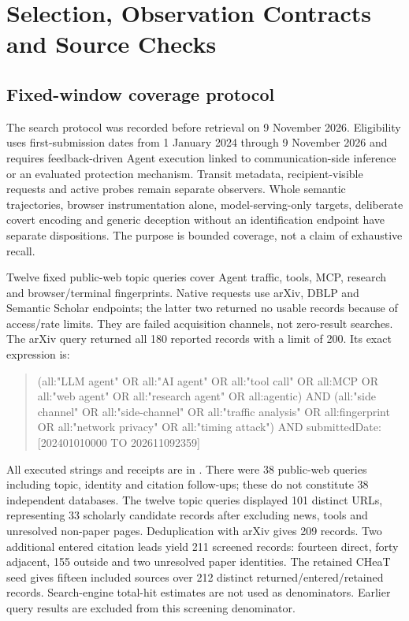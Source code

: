 \section{Selection, Observation Contracts and Source Checks}\label{supp:sources}
\subsection{Fixed-window coverage protocol}
The search protocol was recorded before retrieval on 9 November 2026. Eligibility uses first-submission dates from 1 January 2024 through 9 November 2026 and requires feedback-driven Agent execution linked to communication-side inference or an evaluated protection mechanism. Transit metadata, recipient-visible requests and active probes remain separate observers. Whole semantic trajectories, browser instrumentation alone, model-serving-only targets, deliberate covert encoding and generic deception without an identification endpoint have separate dispositions. The purpose is bounded coverage, not a claim of exhaustive recall.

Twelve fixed public-web topic queries cover Agent traffic, tools, MCP, research and browser/terminal fingerprints. Native requests use arXiv, DBLP and Semantic Scholar endpoints; the latter two returned no usable records because of access/rate limits. They are failed acquisition channels, not zero-result searches. The arXiv query returned all 180 reported records with a limit of 200. Its exact expression is:
\begin{quote}\small\ttfamily\raggedright
(all:"LLM agent" OR all:"AI agent" OR all:"tool call" OR all:MCP OR all:"web agent" OR all:"research agent" OR all:agentic) AND (all:"side channel" OR all:"side-channel" OR all:"traffic analysis" OR all:fingerprint OR all:"network privacy" OR all:"timing attack") AND submittedDate:[202401010000 TO 202611092359]
\end{quote}
All executed strings and receipts are in . There were 38 public-web queries including topic, identity and citation follow-ups; these do not constitute 38 independent databases. The twelve topic queries displayed 101 distinct URLs, representing 33 scholarly candidate records after excluding news, tools and unresolved non-paper pages. Deduplication with arXiv gives 209 records. Two additional entered citation leads yield 211 screened records: fourteen direct, forty adjacent, 155 outside and two unresolved paper identities. The retained CHeaT seed gives fifteen included sources over 212 distinct returned/entered/retained records. Search-engine total-hit estimates are not used as denominators. Earlier query results are excluded from this screening denominator.

